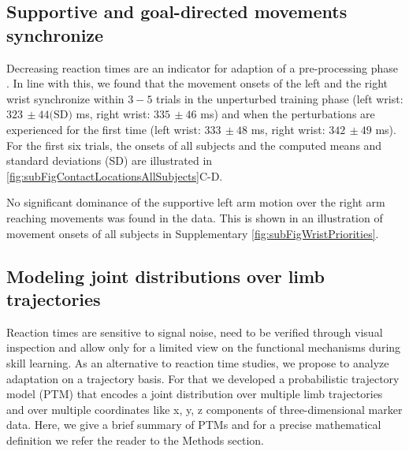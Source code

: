 

\subsection{Supportive and goal-directed movements synchronize}

Decreasing reaction times are an indicator for adaption of a pre-processing 
phase \cite{klatzky1995planning}. In line with this, we found that the movement onsets of the left 
and the right wrist synchronize within $3-5$ trials in the unperturbed training 
phase (left wrist: $323 \, \pm 44 \textrm{(SD)}$ ms, right wrist: $335 \, \pm 46$ ms) and when the 
perturbations are experienced for the first time (left wrist: $333 \, \pm 48$ ms, right wrist: $342 \, \pm 49$ ms). 
For the first six trials, the onsets of all subjects and the computed means and standard deviations (SD) are illustrated in \FigureAbbr \ref{fig:subFigContactLocationsAllSubjects}C-D. 

No significant dominance of the supportive left arm motion 
over the right arm reaching movements was found in the data. 
This is shown in an illustration of movement onsets of all subjects in Supplementary \FigureAbbr \ref{fig:subFigWristPriorities}. 



\subsection{Modeling joint distributions over limb trajectories}
Reaction times are sensitive to signal noise, need to be verified through visual inspection and 
allow only for a limited view on the functional mechanisms during skill learning. 
As an alternative to reaction time studies, we propose to analyze adaptation on 
a trajectory basis. 
%
For that we developed a probabilistic trajectory model (PTM) that encodes a 
joint distribution over multiple limb trajectories and over multiple coordinates 
like x, y, z components of three-dimensional marker data. Here, we give a brief 
summary of PTMs and for a precise mathematical definition we refer the reader to 
the Methods section. 

